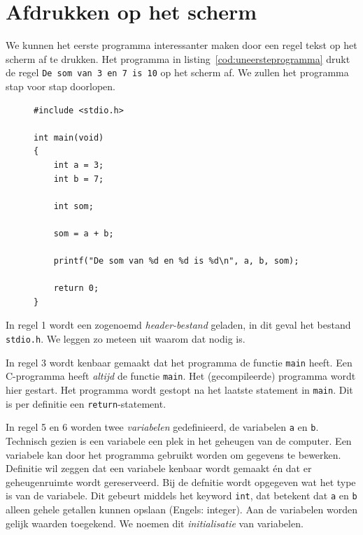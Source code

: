 \section{Afdrukken op het scherm}
We kunnen het eerste programma interessanter maken door een regel tekst op het scherm af te drukken. Het programma in listing~\ref{cod:uneersteprogramma} drukt de regel \texttt{De som van 3 en 7 is 10} op het scherm af. We zullen het programma stap voor stap doorlopen.

\begin{figure}[!ht]
\begin{lstlisting}[caption=Afdrukken van de som van twee getallen.,label=cod:uneersteprogramma]
#include <stdio.h>

int main(void)
{
    int a = 3;
    int b = 7;

    int som;

    som = a + b;

	printf("De som van %d en %d is %d\n", a, b, som);

	return 0;
}
\end{lstlisting}
\end{figure}

In regel 1 wordt een zogenoemd \textsl{header-bestand} geladen, in dit geval het bestand \texttt{stdio.h}. We leggen zo meteen uit waarom dat nodig is.

In regel 3 wordt kenbaar gemaakt dat het programma de functie \texttt{main} heeft. Een C-programma heeft \textsl{altijd} de functie \texttt{main}. Het (gecompileerde) programma wordt hier gestart. Het programma wordt gestopt na het laatste statement in \texttt{main}. Dit is per definitie een \mbox{\texttt{return}}-statement.

In regel 5 en 6 worden twee \textsl{variabelen} gedefinieerd, de variabelen \texttt{a} en \texttt{b}. Technisch gezien is een variabele een plek in het geheugen van de computer. Een variabele kan door het programma gebruikt worden om gegevens te bewerken. Definitie wil zeggen dat een variabele kenbaar wordt gemaakt én dat er geheugenruimte wordt gereserveerd. Bij de defnitie wordt opgegeven wat het type is van de variabele. Dit gebeurt middels het keyword \texttt{int}, dat betekent dat \texttt{a} en \texttt{b} alleen gehele getallen kunnen opslaan (Engels: integer). Aan de variabelen worden gelijk waarden toegekend. We noemen dit \textsl{initialisatie} van variabelen.

